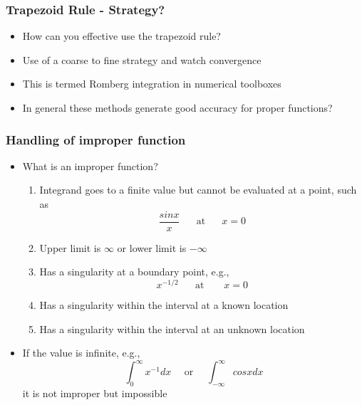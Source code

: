 \documentclass[10pt]{beamer}
\begin{document}
\begin{frame}
  \frametitle{Trapezoid Rule - Strategy?}
  \begin{itemize}
  \item How can you effective use the trapezoid rule?
    \pause
  \item Use of a coarse to fine strategy and watch convergence
  \item This is termed Romberg integration in numerical toolboxes
  \item In general these methods generate good accuracy for proper functions? 
  \end{itemize}
\end{frame}

\begin{frame}
  \frametitle{Handling of improper function}
  \begin{itemize}
  \item What is an improper function?
    \pause
    \begin{enumerate}
    \item Integrand goes to a finite value but cannot be evaluated at a point, such as
      \[
        \frac{sin x}{x} \mbox{ ~~~ at ~~~ } x=0
      \]
    \item Upper limit is $\infty$ or lower limit is $-\infty$
    \item Has a singularity at a boundary point, e.g.,
      \[
        x^{-1/2} \mbox{~~~~ at ~~~~~} x = 0
      \]
    \item Has a singularity within the interval at a known location
    \item Has a singularity within the interval at an unknown location
    \end{enumerate}
  \item If the value is infinite, e.g.,
    \[
      \int_0^{\infty} x^{-1} dx \mbox{~~~~or~~~~} \int_{-\infty}^{\infty} cos x dx
    \] it is not improper but impossible
  \end{itemize}
\end{frame}
\end{document}
